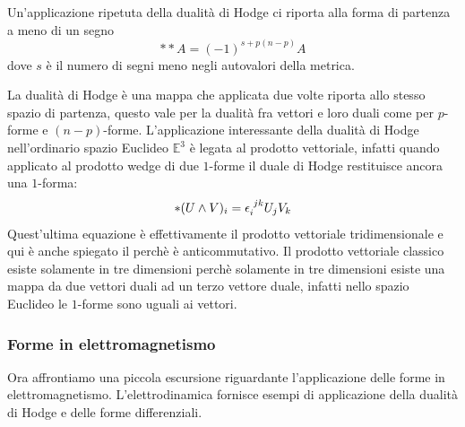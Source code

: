 \documentclass[twoside]{article}
\begin{document}
Un'applicazione ripetuta della dualità di Hodge ci riporta alla forma di partenza a meno di un segno
\begin{equation}\label{eq:hodgedualitydouble}
**A = (-1)^{s+p(n-p)}A
\end{equation}
dove $s$ è il numero di segni meno negli autovalori della metrica. 

La dualità di Hodge è una mappa che applicata due volte riporta allo stesso spazio di partenza, questo vale per la dualità fra vettori e loro duali come per $p$-forme e $(n-p)$-forme. L'applicazione interessante della dualità di Hodge nell'ordinario spazio Euclideo $\mathbb{E}^3$ è legata al prodotto vettoriale, infatti quando applicato al prodotto wedge di due $1$-forme il duale di Hodge restituisce ancora una $1$-forma:
\begin{equation}\label{eq:hodgecrossproduct}
*(U\wedge V)_i = \epsilon\indices{_i^{jk}}U_jV_k
\end{equation}
Quest'ultima equazione è effettivamente il prodotto vettoriale tridimensionale e qui è anche spiegato il perchè è anticommutativo. Il prodotto vettoriale classico esiste solamente in tre dimensioni perchè solamente in tre dimensioni esiste una mappa da due vettori duali ad un terzo vettore duale, infatti nello spazio Euclideo le $1$-forme sono uguali ai vettori.
\subsubsection{Forme in elettromagnetismo}
Ora affrontiamo una piccola escursione riguardante l'applicazione delle forme in elettromagnetismo. L'elettrodinamica fornisce esempi di applicazione della dualità di Hodge e delle forme differenziali. 
\end{document}
